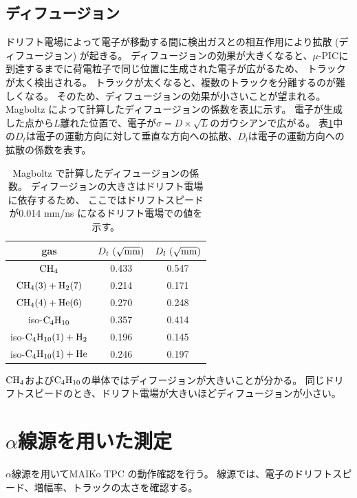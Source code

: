 \subsection{ディフュージョン}
ドリフト電場によって電子が移動する間に検出ガスとの相互作用により拡散 (ディフュージョン) が起きる。
ディフュージョンの効果が大きくなると、$\mu$-PICに到達するまでに荷電粒子で同じ位置に生成された電子が広がるため、
トラックが太く検出される。
トラックが太くなると、複数のトラックを分離するのが難しくなる。
そのため、ディフュージョンの効果が小さいことが望まれる。
Magboltz によって計算したディフュージョンの係数を表\ref{tab::diffusion}に示す。
電子が生成した点から$L$離れた位置で、電子が$\sigma = D\times\sqrt{L}$のガウシアンで広がる。
表\ref{tab::diffusion}中の$D_{t}$は電子の運動方向に対して垂直な方向への拡散、$D_{l}$は電子の運動方向への拡散の係数を表す。
\begin{table}
  \centering
  \caption[Magboltz で計算したディフュージョンの係数。]
          {Magboltz で計算したディフュージョンの係数。
            ディフージョンの大きさはドリフト電場に依存するため、
            ここではドリフトスピードが0.014 mm/ns になるドリフト電場での値を示す。}
  \label{tab::diffusion}
  \begin{tabular}{ccc}
    \toprule
    gas & $D_{t}~(\sqrt{\rm mm})$ & $D_{l}~(\sqrt{\rm mm})$ \\
    \midrule
    ${\rm CH_{4}}$ & 0.433 & 0.547\\
    ${\rm CH_{4} (3) + H_{2} (7)}$ & 0.214 & 0.171\\
    ${\rm CH_{4} (4) + He (6)}$ & 0.270  & 0.248 \\
    iso-${\rm C_{4}H_{10}}$ & 0.357 & 0.414 \\
    iso-${\rm C_{4}H_{10} (1) + H_{2}}$ & 0.196 & 0.145 \\
    iso-${\rm C_{4}H_{10} (1) + He}$ & 0.246 & 0.197 \\
    \bottomrule
  \end{tabular}
\end{table}
${\rm CH_{4}}$および${\rm C_{4}H_{10}}$の単体ではディフージョンが大きいことが分かる。
同じドリフトスピードのとき、ドリフト電場が大きいほどディフュージョンが小さい。

\section{$\alpha$線源を用いた測定}
$\alpha$線源を用いてMAIKo TPC の動作確認を行う。
線源では、電子のドリフトスピード、増幅率、トラックの太さを確認する。

